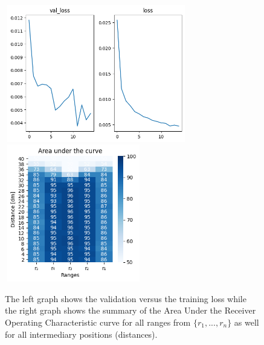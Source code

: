 \begin{multicols}{2}
\begin{itemize}
\end{itemize}
\end{multicols}\begin{figure}[H]%
\centering
\includegraphics[width=8cm,height=6cm]{3_models/models_45/graph_45.png}
\hspace{0.2 cm}
\includegraphics[width=6cm,height=6cm]{4_plots/plots_45/AUC_45.png}
\caption{The left graph shows the validation versus the training loss while the right graph shows the summary of the Area Under the Receiver Operating Characteristic curve for all ranges from $\{r_{1}, ... ,r_{n}\}$ as well for all intermediary positions (distances).}
\label{auc_45}
\end{figure}



